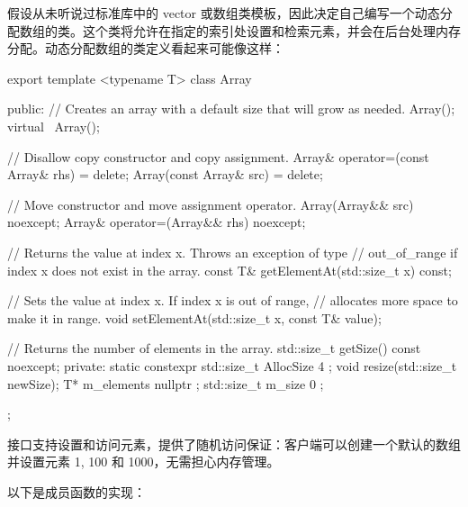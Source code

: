 
假设从未听说过标准库中的 vector 或数组类模板，因此决定自己编写一个动态分配数组的类。这个类将允许在指定的索引处设置和检索元素，并会在后台处理内存分配。动态分配数组的类定义看起来可能像这样：

\begin{cpp}
export template <typename T>
class Array
{
    public:
        // Creates an array with a default size that will grow as needed.
        Array();
        virtual ~Array();

        // Disallow copy constructor and copy assignment.
        Array& operator=(const Array& rhs) = delete;
        Array(const Array& src) = delete;

        // Move constructor and move assignment operator.
        Array(Array&& src) noexcept;
        Array& operator=(Array&& rhs) noexcept;

        // Returns the value at index x. Throws an exception of type
        // out_of_range if index x does not exist in the array.
        const T& getElementAt(std::size_t x) const;

        // Sets the value at index x. If index x is out of range,
        // allocates more space to make it in range.
        void setElementAt(std::size_t x, const T& value);

        // Returns the number of elements in the array.
        std::size_t getSize() const noexcept;
    private:
        static constexpr std::size_t AllocSize { 4 };
        void resize(std::size_t newSize);
        T* m_elements { nullptr };
        std::size_t m_size { 0 };
};
\end{cpp}

接口支持设置和访问元素，提供了随机访问保证：客户端可以创建一个默认的数组并设置元素 1, 100 和 1000，无需担心内存管理。

以下是成员函数的实现：

